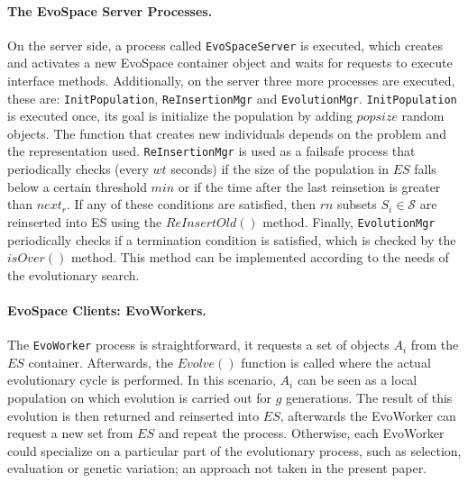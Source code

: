 \documentclass{llncs}
\begin{document}
\paragraph{The EvoSpace Server Processes.}
On the server side, a process called \texttt{EvoSpaceServer} is executed, which creates and activates a new EvoSpace
container object and waits for requests to execute interface methods.
Additionally, on the server three more processes are executed, these are: \texttt{InitPopulation}, \texttt{ReInsertionMgr} and \texttt{EvolutionMgr}.
\texttt{InitPopulation} is executed once, its goal is initialize the population by adding $popsize$ random
objects. The function that creates new individuals depends on the problem and the representation used.
\texttt{ReInsertionMgr} is used as a failsafe process that periodically checks (every $wt$ seconds) if the size of the population in $ES$
falls below a certain threshold $min$ or if the time after the last reinsetion is greater than $next_r$.
If any of these conditions are satisfied, then $rn$ subsets $S_i \in \mathcal{S}$ are reinserted into ES using the $ReInsertOld()$ method.
Finally, \texttt{EvolutionMgr} periodically checks if a termination condition is satisfied, which is checked by the $isOver()$ method.
This method can be implemented according to the needs of the evolutionary search.


\paragraph{EvoSpace Clients: EvoWorkers.}
The \texttt{EvoWorker} process is straightforward, it requests a set of objects $A_i$ from the $ES$ container.
Afterwards, the $Evolve()$ function is called where the actual evolutionary cycle is performed.
In this scenario, $A_i$ can be seen as a local population on which evolution is carried out for $g$ generations.
The result of this evolution is then returned and reinserted into $ES$, afterwards the EvoWorker can request a new set from $ES$ and repeat the process.
Otherwise, each EvoWorker could specialize on a particular part of the evolutionary process, such as selection, evaluation or genetic variation;
an approach not taken in the present paper.
\end{document}
